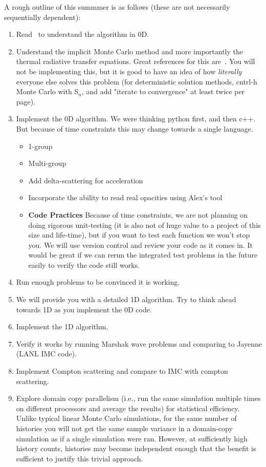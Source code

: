 \documentclass{article}
\begin{document}
A rough outline of this summmer is as follows (these are not necessarily
sequentially dependent):
\begin{enumerate}

\item Read~\cite{booth2011} to understand the algorithm in 0D.  
\item Understand the implicit Monte Carlo method and more importantly the
thermal radiative transfer equations.
Great references for this are~\cite{wollaber_review,wollaber_thesis}.  You will
not be implementing this, but it is good to have an idea of how \emph{literally}
everyone else solves this problem (for deterministic solution methods, cntrl-h
Monte Carlo with S$_n$, and add "iterate to convergence" at least twice per
page).
\item Implement the 0D algorithm.  We were thinking python first, and then c++.
But because of time constraints this may change towards a single language.
\begin{itemize}
\item 1-group
\item Multi-group
\item Add delta-scattering for acceleration
\item Incorporate the ability to read real opacities using Alex's tool
\item \textbf{Code Practices} Because of time constraints, we are
not planning on doing rigorous unit-testing (it is also not of huge value to a
project of this size and life-time), but if you want to test each function we
won't stop you.  We will use version control and review your code as it comes
in.  It would be great if we can rerun the integrated
test problems in the future easily to verify the code still works.
\end{itemize}
\item Run enough problems to be convinced it is working. 
\item We will provide you with a detailed 1D algorithm.  Try to think ahead
towards 1D as you implement the 0D code.
\item Implement the 1D algorithm.
\item Verify it works by running Marshak wave problems and comparing to Jayenne
(LANL IMC code). 
\item Implement Compton scattering and compare to IMC with compton scattering.
\item Explore domain copy parallelism (i.e., run the same simulation multiple
times on different processors and average the results) for statistical
efficiency.  Unlike typical linear Monte Carlo simulations, for the same number of histories you
will not get the same sample variance in a domain-copy simulation as if a single
simulation were ran.
However, at sufficiently high history counts, histories may become independent enough that
the benefit is sufficient to justify this trivial approach.
\end{enumerate}
\end{document}

